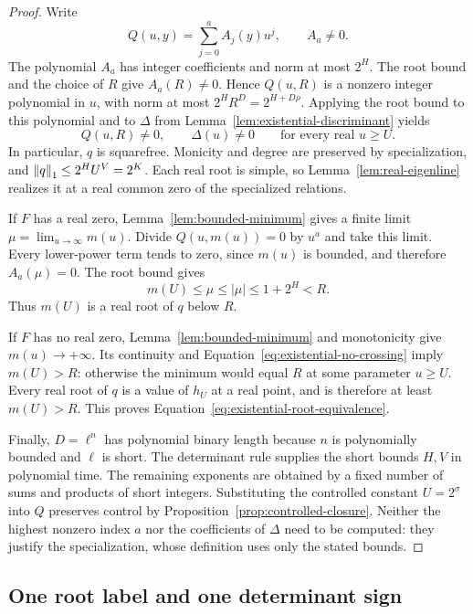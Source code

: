 \begin{proof}
Write
\[
 Q(u,y)=\sum_{j=0}^{a} A_j(y)u^j,\qquad A_a\ne0.
\]
The polynomial $A_a$ has integer coefficients and norm at most $2^H$.
The root bound and the choice of $R$ give $A_a(R)\ne0$.  Hence
$Q(u,R)$ is a nonzero integer polynomial in $u$, with norm at most
$2^H R^D=2^{H+D\rho}$.  Applying the root bound to this polynomial and
to $\Delta$ from Lemma~\ref{lem:existential-discriminant} yields
\begin{equation}\label{eq:existential-no-crossing}
 Q(u,R)\ne0,\qquad \Delta(u)\ne0
 \qquad\text{for every real }u\ge U.
\end{equation}
In particular, $q$ is squarefree.  Monicity and degree are preserved by
specialization, and $\left\lVert q\right\rVert_1\le2^H U^V=2^K$.  Each real root is simple,
so Lemma~\ref{lem:real-eigenline} realizes it at a real common zero of
the specialized relations.

If $F$ has a real zero, Lemma~\ref{lem:bounded-minimum} gives a finite
limit $\mu=\lim_{u\to\infty}m(u)$.  Divide $Q(u,m(u))=0$ by $u^a$
and take this limit.  Every lower-power term tends to zero, since
$m(u)$ is bounded, and therefore $A_a(\mu)=0$.  The root bound gives
\[
 m(U)\le\mu\le|\mu|\le1+2^H<R.
\]
Thus $m(U)$ is a real root of $q$ below $R$.

If $F$ has no real zero, Lemma~\ref{lem:bounded-minimum} and monotonicity
give $m(u)\to+\infty$.  Its continuity and
Equation~\eqref{eq:existential-no-crossing} imply $m(U)>R$: otherwise
the minimum would equal $R$ at some parameter $u\ge U$.
Every real root of $q$ is a value of $h_U$ at a real point, and is
therefore at least $m(U)>R$.  This proves
Equation~\eqref{eq:existential-root-equivalence}.

Finally, $D=\ell^n$ has polynomial binary length because $n$ is
polynomially bounded and $\ell$ is short.  The determinant rule supplies
the short bounds $H,V$ in polynomial time.  The remaining exponents
are obtained by a fixed number of sums and products of short integers.
Substituting the controlled constant $U=2^\sigma$ into $Q$ preserves
control by Proposition~\ref{prop:controlled-closure}.  Neither the
highest nonzero index $a$ nor the coefficients of $\Delta$ need to be
computed: they justify the specialization, whose definition uses only
the stated bounds.
\end{proof}

\subsection{One root label and one determinant sign}

